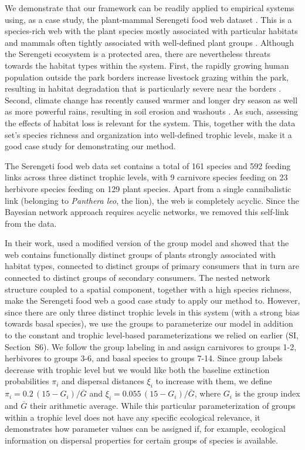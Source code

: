 \documentclass[11pt]{article}
\newcommand{\SI}{SI}
\begin{document}
We demonstrate that our framework can be readily applied to empirical systems using, as a case study, the plant-mammal Serengeti food web dataset  \citep{Baskerville2011}.  This is a species-rich web with the plant species mostly associated with particular habitats and mammals often tightly associated with well-defined plant groups \citep{Baskerville2011}. Although the Serengeti ecosystem is a protected area, there are nevertheless threats towards the habitat types within the system. First, the rapidly growing human population outside the park borders increase livestock grazing within the park, resulting in habitat degradation that is particularly severe near the borders \citep{Veldhuis2019cross}. Second, climate change has recently caused warmer and longer dry season as well as more powerful rains, resulting in soil erosion and washouts \citep{Ritchie2008global}. As such, assessing the effects of habitat loss is relevant for the system. This, together with the data set's species richness and organization into well-defined trophic levels, make it a good case study for demonstrating our method.

The Serengeti food web data set \citep{Baskerville2011} contains a total of 161 species and 592 feeding links across three distinct trophic levels, with 9 carnivore species feeding on 23 herbivore species feeding on 129 plant species. Apart from a single cannibalistic link (belonging to \textit{Panthera leo}, the lion), the web is completely acyclic. Since the Bayesian network approach requires acyclic networks, we removed this self-link from the data.

In their work, \citet{Baskerville2011} used a modified version of the group model \citep{AllesinaPascual2009ELE} and showed that the web contains functionally distinct groups of plants strongly associated with habitat types, connected to distinct groups of primary consumers that in turn are connected to distinct groups of secondary consumers. The nested network structure coupled to a spatial component, together with a high species richness, make the Serengeti food web a good case study to apply our method to. However, since there are only three distinct trophic levels in this system (with a strong bias towards basal species), we use the groups to parameterize our model in addition to the constant and trophic level-based parameterizations we relied on earlier (\SI, Section~S6). We follow the group labeling in \citet{Baskerville2011} and assign carnivores to groups 1-2, herbivores to groups 3-6, and basal species to groups 7-14. Since group labels decrease with trophic level but we would like both the baseline extinction probabilities $\pi_i$ and dispersal distances $\xi_i$ to increase with them, we define $\pi_i = 0.2 \, (15 - G_i) / \overline{G}$ and $\xi_i = 0.055 \, (15 - G_i) / \overline{G}$, where $G_i$ is the group index and $\overline{G}$ their arithmetic average. While this particular parameterization of groups within a trophic level does not have any specific ecological relevance, it demonstrates how parameter values can be assigned if, for example, ecological information on dispersal properties for certain groups of species is available.
\end{document}

